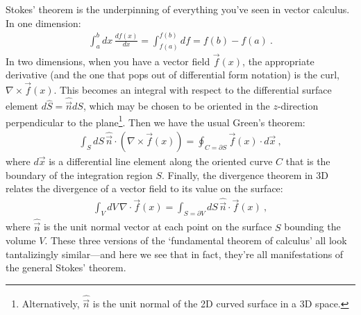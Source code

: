 Stokes' theorem is the underpinning of everything you've seen in vector calculus. In one dimension:
\begin{align}
  \int_a^b dx\, \frac{df(x)}{dx} = \int_{f(a)}^{f(b)} df = f(b)-f(a) \ .
\end{align}
In two dimensions, when you have a vector field $\vec{f}(x)$, the appropriate derivative (and the one that pops out of differential form notation) is the curl, $\nabla\times \vec{f}(x)$. This becomes an integral with respect to the differential surface element $d\hat{S} = \hat{\vec{n}} dS$, which may be chosen to be oriented in the $z$-direction perpendicular to the plane\footnote{Alternatively, $\hat{\vec{n}}$ is the unit normal of the 2D curved surface in a 3D space.}. Then we have the usual  Green's theorem:
\begin{align}
  \int_S dS\, \hat{\vec{n}}\cdot \left(\nabla\times \vec{f}(x)\right) 
  =
  \oint_{C=\partial S} \vec{f}(x)\cdot d\vec{x} 
  \ ,
\end{align}
where $d\vec{x}$ is a differential line element along the oriented curve $C$ that is the boundary of the integration region $S$. Finally, the divergence theorem in 3D relates the divergence of a vector field to its value on the surface:
\begin{align}
  \int_V dV \, \nabla\cdot \vec{f}(x)
  =
  \int_{S=\partial V} dS \, \hat{\vec{n}} \cdot \vec{f}(x) \ ,
\end{align}
where $\hat{\vec{n}}$ is the unit normal vector at each point on the surface $S$ bounding the volume $V$. These three versions of the `fundamental theorem of calculus' all look tantalizingly similar---and here we see that in fact, they're all manifestations of the general Stokes' theorem. 

